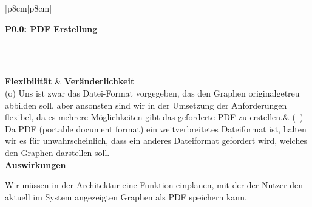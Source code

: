 \documentclass[enabledeprecatedfontcommands,fontsize=11pt,paper=a4,twoside]{scrartcl}
\newcounter{one}
\newcounter{two}[one]
\newcommand{\tone}{0\theone}
\newcommand{\two}{\stepcounter{two}0\thetwo}
\begin{document}
\begin{tabular} {|p{8cm}|p{8cm}|}
	\hline
	 {\parbox{16cm}{\textbf{\hypertarget{kk}{P\tone.\two}: PDF Erstellung}} } \\  \hline\hline 
	\rule{0pt}{6ex}\\ [3ex] \hline
	\textbf{Flexibilität}  & \textbf{Veränderlichkeit} \\
	(o) Uns ist zwar das Datei-Format vorgegeben, das den Graphen originalgetreu abbilden soll, aber ansonsten sind wir in der Umsetzung der Anforderungen flexibel, da es mehrere Möglichkeiten gibt das geforderte PDF zu erstellen.& 
	(–) Da PDF (portable document format) ein weitverbreitetes Dateiformat ist, halten wir es für unwahrscheinlich, dass ein anderes Dateiformat gefordert wird, welches den Graphen darstellen soll.\\
	\hline
	 {\textbf{Auswirkungen}} \\
	 {\parbox{16cm}{Wir müssen in der Architektur eine Funktion einplanen, mit der der Nutzer den aktuell im System angezeigten Graphen als PDF speichern kann. } }\\ \hline
\end{tabular}
\\ \\ \\ \\%
\end{document}
